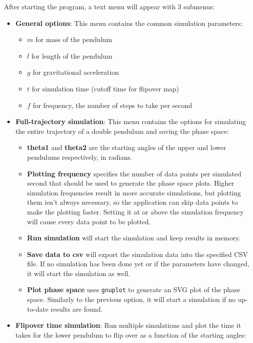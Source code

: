 \documentclass[a4paper,12pt]{article}
\begin{document}
After starting the program, a text menu will appear with 3 submenus:
\begin{itemize}
 \item \textbf{General options}: This menu contains the common simulation parameters:
 \begin{itemize}
  \item $m$ for mass of the pendulum
  \item $l$ for length of the pendulum
  \item $g$ for gravitational acceleration
  \item $t$ for simulation time (cutoff time for flipover map)
  \item $f$ for frequency, the number of steps to take per second
 \end{itemize}
 \item \textbf{Full-trajectory simulation}: This menu contains the options for simulating the entire
 trajectory of a double pendulum and saving the phase space:
 \begin{itemize}
  \item \textbf{theta1} and \textbf{theta2} are the starting angles of the upper and lower pendulums
  respectively, in radians.
  \item \textbf{Plotting frequency} specifies the number of data points per simulated second that should be used
  to generate the phase space plots. Higher simulation frequencies result in more accurate simulations,
  but plotting them isn't always necessary, so the application can skip data points to make the plotting faster.
  Setting it at or above the simulation frequency will cause every data point to be plotted.
  \item \textbf{Run simulation} will start the simulation and keep results in memory.
  \item \textbf{Save data to csv} will export the simulation data into the specified CSV file.
  If no simulation has been done yet or if the parameters have changed, it will start the simulation as well.
  \item \textbf{Plot phase space} uses \texttt{gnuplot} to generate an SVG plot of the phase space.
  Similarly to the previous option, it will start a simulation if no up-to-date results are found.
 \end{itemize}
 \item \textbf{Flipover time simulation}: Run multiple simulations and plot the time it takes for the
 lower pendulum to flip over as a function of the starting angles:
 \begin{itemize}

\end{itemize}
\end{itemize}
\end{document}
